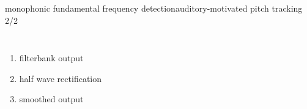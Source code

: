 	\begin{frame}{monophonic fundamental frequency detection}{auditory-motivated pitch tracking 2/2}
        \begin{columns}
            \begin{enumerate}
                \item   filterbank output
                \bigskip
                \bigskip
                \bigskip
                \item   half wave rectification
                \bigskip
                \bigskip
                \bigskip
                \item   smoothed output
            \end{enumerate}
            \vspace{-3mm}
        \end{columns}
	\end{frame}
    
        
